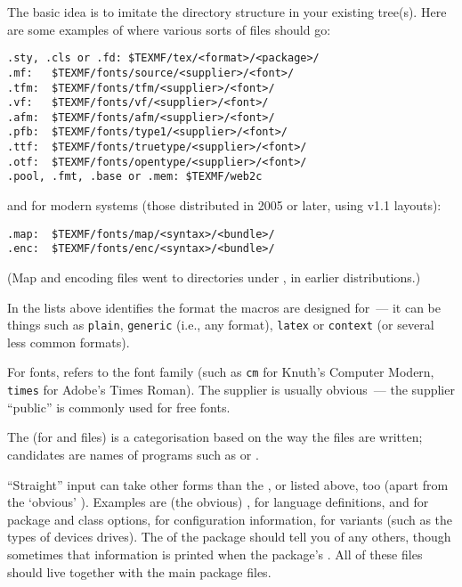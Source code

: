 The basic idea is to imitate the directory structure in your
existing tree(s). Here are some examples of where various sorts of
files should go:
\begin{verbatim}
.sty, .cls or .fd: $TEXMF/tex/<format>/<package>/
.mf:   $TEXMF/fonts/source/<supplier>/<font>/
.tfm:  $TEXMF/fonts/tfm/<supplier>/<font>/
.vf:   $TEXMF/fonts/vf/<supplier>/<font>/
.afm:  $TEXMF/fonts/afm/<supplier>/<font>/
.pfb:  $TEXMF/fonts/type1/<supplier>/<font>/
.ttf:  $TEXMF/fonts/truetype/<supplier>/<font>/
.otf:  $TEXMF/fonts/opentype/<supplier>/<font>/
.pool, .fmt, .base or .mem: $TEXMF/web2c
\end{verbatim}
and for modern systems (those distributed in 2005 or later, using 
v1.1 layouts):
\begin{verbatim}
.map:  $TEXMF/fonts/map/<syntax>/<bundle>/
.enc:  $TEXMF/fonts/enc/<syntax>/<bundle>/
\end{verbatim}
(Map and encoding files went to directories under
, %
in earlier distributions.)

In the lists above  identifies the format the macros
are designed for~--- it can be things such as \texttt{plain},
\texttt{generic} (i.e., any format), \texttt{latex} or
\texttt{context} (or several less common formats).

For fonts,  refers to the font family (such as \texttt{cm}
for Knuth's Computer Modern, \texttt{times} for Adobe's Times Roman).
The supplier is usually obvious~--- the supplier
``public'' is commonly used for free fonts.

The  (for  and  files) is a
categorisation based on the way the files are written; candidates are
names of programs such as  or .

``Straight'' \AllTeX{} input can take other forms than the
,  or  listed above, too
(apart from the `obvious' ).  Examples are (the
obvious) ,  for  language
definitions,  and  for package and class
options,  for configuration information,
 for variants (such as the types of devices
 drives).  The  of the package should
tell you of any others, though sometimes that information is printed
when the package's .
All of these files should live together with the main package files.

